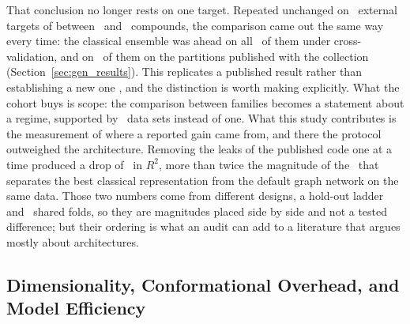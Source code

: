 That conclusion no longer rests on one target. Repeated unchanged on \GenNTargets\ external targets of between
\GenNMin\ and \GenNMax\ compounds, the comparison came out the same way every time: the classical ensemble was ahead
on all \GenNTargets\ of them under cross-validation, and on \GenHoldoutAdvNClassical\ of them on the partitions
published with the collection (Section~\ref{sec:gen_results}). This replicates a published result rather than
establishing a new one \citep{vantilborg2022}, and the distinction is worth making explicitly. What the cohort buys
is scope: the comparison between families becomes a statement about a regime, supported by \GenNTargets\ data sets
instead of one. What this study contributes is the measurement of where a reported gain came from, and there the
protocol outweighed the architecture. Removing the leaks of the published code one at a time produced a drop of
\KarDeltaRungFourVsRungZeroRTwo\ in $R^2$, more than twice the magnitude of the \GnnVsMorganDiffRTwo\ that separates
the best classical representation from the default graph network on the same data. Those two numbers come from
different designs, a hold-out ladder and \TotalOuterFolds\ shared folds, so they are magnitudes placed side by side
and not a tested difference; but their ordering is what an audit can add to a literature that argues mostly about
architectures.


\subsection{Dimensionality, Conformational Overhead, and Model Efficiency}

